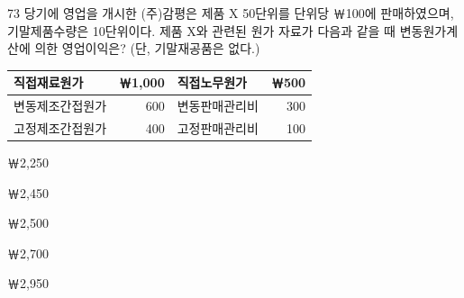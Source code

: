 \begin{question}{73}
당기에 영업을 개시한 (주)감평은 제품 X 50단위를 단위당 ￦100에 판매하였으며, 기말제품수량은 10단위이다. 제품 X와 관련된 원가 자료가 다음과 같을 때 변동원가계산에 의한 영업이익은? (단, 기말재공품은 없다.)
\par
{\small\centering
\begin{tabular}{|l|r|l|r|}\hline
직접재료원가 & ￦1,000 & 직접노무원가 & ￦500 \\\hline
변동제조간접원가 & 600 & 변동판매관리비 & 300 \\\hline
고정제조간접원가 & 400 & 고정판매관리비 & 100 \\\hline
\end{tabular}\par}
\begin{choices}
  \item ￦2,250
  \item ￦2,450
  \item ￦2,500
  \item ￦2,700
  \item ￦2,950
\end{choices}
\end{question}
